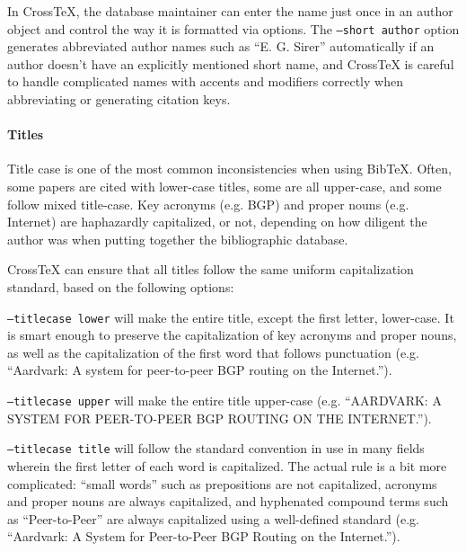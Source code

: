 \documentclass{article}
\newcommand{\XTeX}{Cross\TeX}
\begin{document}
In \XTeX{}, the database maintainer can enter the name just once in an
author object and control the way it is formatted via options. The
\texttt{--short author} option generates abbreviated author names such
as ``E. G. Sirer'' automatically if an author doesn't have an
explicitly mentioned short name, and \XTeX{} is careful to handle
complicated names with accents and modifiers correctly when
abbreviating or generating citation keys. 

\paragraph{Titles}

Title case is one of the most common inconsistencies when using
BibTeX. Often, some papers are cited with lower-case titles, some are
all upper-case, and some follow mixed title-case. Key acronyms
(e.g. BGP) and proper nouns (e.g. Internet) are haphazardly
capitalized, or not, depending on how diligent the author was when
putting together the bibliographic database.

\XTeX{} can ensure that all titles follow the same uniform capitalization
standard, based on the following options:

\begin{description}

\item\texttt{--titlecase lower} will make the entire title, except the first letter,
lower-case. It is smart enough to preserve the capitalization of key acronyms 
and proper nouns, as well as the capitalization of the first word that follows
punctuation (e.g. ``Aardvark: A system for peer-to-peer BGP routing on the Internet.'').


\item\texttt{--titlecase upper} will make the entire title upper-case
(e.g. ``AARDVARK: A SYSTEM FOR PEER-TO-PEER BGP ROUTING ON THE INTERNET.'').

\item\texttt{--titlecase title} will follow the standard convention in use
in many fields wherein the first letter of each word is capitalized. The 
actual rule is a bit more complicated: ``small words'' such as prepositions 
are not capitalized, acronyms and proper nouns are always capitalized, and
hyphenated compound terms such as ``Peer-to-Peer'' are always capitalized
using a well-defined standard (e.g. ``Aardvark: A System for Peer-to-Peer BGP Routing on the Internet.'').

\end{description}
\end{document}
